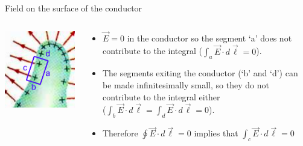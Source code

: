 %
%
%

\begin{frame}{Field on the surface of the conductor}

\begin{columns}
  \begin{column}{0.30\textwidth}
   \begin{center}
     \includegraphics[width=0.99\textwidth]{./images/schematics/conductor_no_tangential_component_circuital_law.png}\\
   \end{center}
  \end{column}
  \begin{column}{0.70\textwidth}
     \begin{itemize}
       \item $\vec{E}=0$ in the conductor so the segment `a' does not contribute
             to the integral ($\int_{a} \vec{E} \cdot d\vec{\ell} = 0$).
       \item The segments exiting the conductor (`b' and `d') can be made infinitesimally small,
             so they do not contribute to the integral either\\
             ($\int_{b} \vec{E} \cdot d\vec{\ell} = \int_{d} \vec{E} \cdot d\vec{\ell} = 0$).
       \item Therefore $\oint \vec{E} \cdot d\vec{\ell} = 0$ implies that $\int_{c} \vec{E} \cdot d\vec{\ell} = 0$
     \end{itemize}
  \end{column}
\end{columns}


\end{frame}
